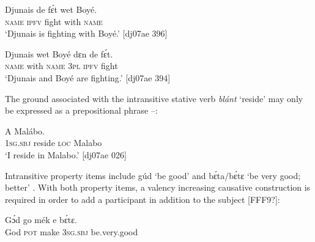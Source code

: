 \ea%
    \label{ex:key:1091}
    \gll Djunais  de  fɛ́t    wet    Boyé.\\
\textsc{name}  \textsc{ipfv}  fight  with    \textsc{name}\\

\glt ‘Djunais is fighting with Boyé.’ [dj07ae 396]
\z


\ea%
    \label{ex:key:1092}
    \gll Djunais  wet    Boyé  dɛn  de  fɛ́t.\\
\textsc{name}  with    \textsc{name}  \textsc{3pl}  \textsc{ipfv}  fight\\

\glt ‘Djunais and Boyé are fighting.’ [dj07ae 394]
\z

The ground associated with the intransitive stative verb \textit{blánt} ‘reside’ may only be expressed as a prepositional phrase –: 


\z


\ea%
    \label{ex:key:1094}
    \gll A       Malábo.\\
\textsc{1sg.sbj}  reside  \textsc{loc}  Malabo\\

\glt ‘I reside in Malabo.’ [dj07ae 026]
\z

Intransitive property items include gúd ‘be good’  and bɛ́ta/bɛ́tɛ ‘be very good; better’ . With both property items, a valency increasing causative construction is required in order to add a participant in addition to the subject [FFF9?]: 


\z


\z


\ea%
    \label{ex:key:1097}
    \gll Gɔ́d    go  mék    e    bɛ́tɛ.\\
God    \textsc{pot}  make  \textsc{3sg.sbj}  be.very.good\\

